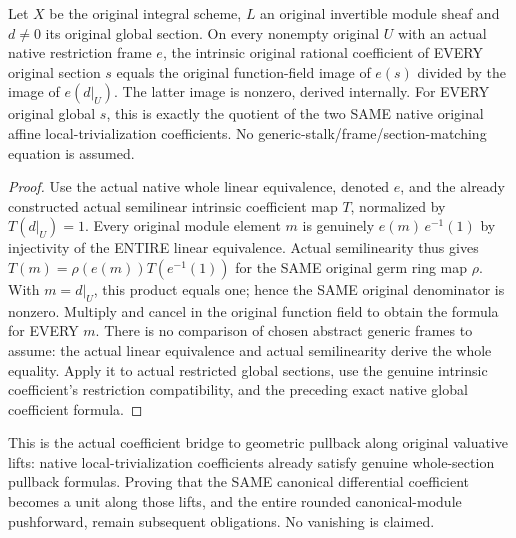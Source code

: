 \begin{theorem}
\label{sc0-native-line-ratio:all-sections}
\leanok
Let $X$ be the original integral scheme, $L$ an original invertible
module sheaf and $d\ne0$ its original global section. On every
nonempty original $U$ with an actual native restriction frame $e$,
the intrinsic original rational coefficient of EVERY original section
$s$ equals the original function-field image of $e(s)$ divided by
the image of $e(d|_U)$. The latter image is nonzero, derived internally.
For EVERY original global $s$, this is exactly the quotient of the
two SAME native original affine local-trivialization coefficients.
No generic-stalk/frame/section-matching equation is assumed.
\end{theorem}
\begin{proof}
Use the actual native whole linear equivalence, denoted $e$, and
the already constructed actual semilinear intrinsic coefficient
map $T$, normalized by $T(d|_U)=1$. Every original module element
$m$ is genuinely $e(m)\,e^{-1}(1)$ by injectivity of the ENTIRE
linear equivalence. Actual semilinearity thus gives
$T(m)=\rho(e(m))T(e^{-1}(1))$ for the SAME original germ ring map
$\rho$. With $m=d|_U$, this product equals one; hence the SAME
original denominator is nonzero. Multiply and cancel in the
original function field to obtain the formula for EVERY $m$.
There is no comparison of chosen abstract generic frames to assume:
the actual linear equivalence and actual semilinearity derive the
whole equality. Apply it to actual restricted global sections,
use the genuine intrinsic coefficient's restriction compatibility,
and the preceding exact native global coefficient formula.
\end{proof}

This is the actual coefficient bridge to geometric pullback along
original valuative lifts: native local-trivialization coefficients
already satisfy genuine whole-section pullback formulas. Proving
that the SAME canonical differential coefficient becomes a unit
along those lifts, and the entire rounded canonical-module
pushforward, remain subsequent obligations. No vanishing is claimed.

